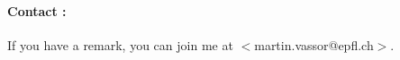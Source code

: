 \documentclass[a4paper, onecolumn, 10pt]{article}
\numberwithin{equation}{section}
\begin{document}
\paragraph{Contact :}
If you have a remark, you can join me at $<$martin.vassor@epfl.ch$>$. 
\end{document}
